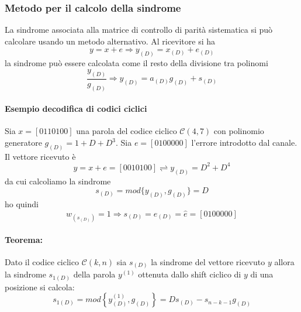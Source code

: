         \subsubsection{Metodo per il calcolo della sindrome}
            La sindrome associata alla matrice di controllo di parità sistematica si può calcolare
            usando un metodo alternativo. Al ricevitore si ha 
            \[
                y=x+e\Rightarrow y_{(D)} = x_{(D)}+e_{(D)}
            \]
            la sindrome può essere calcolata come il resto della divisione tra polinomi
            \[
                \frac{y_{(D)}}{g_{(D)}}\Rightarrow y_{(D)} = a_{(D)}g_{(D)} + s_{(D)} 
            \]
            \paragraph{Esempio decodifica di codici ciclici}
                Sia $x = [0110100]$ una parola del codice ciclico $\mathcal{C}(4,7)$ con polinomio generatore 
                $g_{(D)} = 1+D+D^3$. Sia $e = [0100000]$ l'errore introdotto dal canale. Il vettore ricevuto è 
                \[
                    y= x+e = [0010100]\rightleftharpoons y_{(D)} = D^2+D^4 
                \]
                da cui calcoliamo la sindrome 
                \[
                    s_{(D)} = mod\{y_{(D)},g_{(D)}\}=D
                \]
                ho quindi 
                \[
                    w_{(s_{(D)})} = 1\Rightarrow s_{(D)} =e_{(D)} = \hat{e} = [0100000]  
                \]
            \paragraph{Teorema:} Dato il codice ciclico $\mathcal{C}(k,n)$ sia $s_{(D)}$ la sindrome del vettore ricevuto
                $y$ allora la sindrome $s_{1(D)}$ della parola $y^{(1)}$ ottenuta dallo shift ciclico di $y$ di una posizione 
                si calcola:
                \[
                    s_{1(D)} = mod\left\{y^{(1)}_{(D)},g_{(D)}\right\} = Ds_{(D)}-s_{n-k-1}g_{(D)}    
                \]
